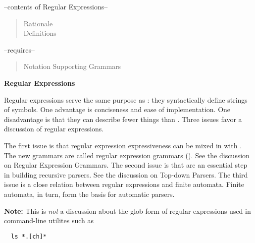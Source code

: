 





\begin{center}
\begin{small}
\noindent --contents of Regular Expressions--
\begin{quote}
\raggedright
Rationale\\
Definitions\\
\end{quote}
--requires--
\begin{quote}
\raggedright
Notation Supporting Grammars\\
\end{quote}
\end{small}
\end{center}

\vspace{1em}


\begin{center}
    {\large \bf Regular Expressions} 
\end{center}

\vspace{1em}

Regular expressions serve the same purpose as : 
they syntactically define strings of symbols.  
One advantage is conciseness and ease of implementation.  
One disadvantage is that they can describe fewer things than .  
Three issues favor a discussion of regular expressions.  

The first issue is that regular expression expressiveness can be mixed 
in with .  The new grammars are called regular expression grammars
().  See the discussion on Regular Expression Grammars.
The second issue is that  are an essential step in building 
recursive parsers.  See the discussion on Top-down Parsers.
The third issue is a close relation between regular expressions 
and finite automata.
Finite automata, in turn, form the basis for automatic parsers.  

{\bf Note:} This is {\em not} a discussion about the glob form of regular
expressions used in command-line utilites such as
\begin{verbatim}
  ls *.[ch]*
\end{verbatim}

\vspace{1em}

